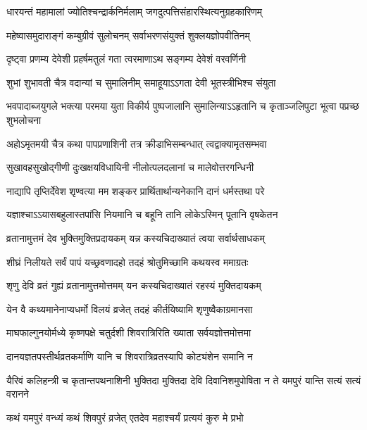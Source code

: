 \twolineshloka
{धारयन्तं महामालां ज्योतिश्चन्द्रार्कनिर्मलाम्}
{जगदुत्पत्तिसंहारस्थित्यनुग्रहकारिणम्} %

\twolineshloka
{महेष्वासमुदाराङ्गं कम्बुग्रीवं सुलोचनम्}
{सर्वाभरणसंयुक्तं शुक्लयज्ञोपवीतिनम्} %

\twolineshloka
{दृष्ट्वा प्रणम्य देवेशी प्रहर्षमतुलं गता}
{त्वरमाणाऽथ सङ्गम्य देवेशं वरवर्णिनी} %

\twolineshloka
{शुभां शुभावती चैत्र वदान्यां च सुमालिनीम्}
{समाहूयाऽऽगता देवी भूतस्त्रीभिश्च संयुता} %

\threelineshloka
{भवपादाब्जयुगले भक्त्या परमया युता}
{विकीर्य पुष्पजालानि सुमालिन्याऽऽहृतानि च}
{कृताञ्जलिपुटा भूत्वा पप्रच्छ शुभलोचना} %


\twolineshloka
{अहोऽमृतमयी चैत्र कथा पापप्रणाशिनी}
{तत्र क्रीडाभिसम्बन्धात् त्वद्वाक्यामृतसम्भवा} %

\twolineshloka
{सुखावहसुखोद्गीणी दुःखक्षयविधायिनी}
{नीलोत्पलदलानां च मालेवोत्तरगन्धिनी} %

\twolineshloka
{नाद्यापि तृप्तिर्देवेश शृण्वत्या मम शङ्कर}
{प्रार्थितार्थान्यनेकानि दानं धर्मस्तथा परे} %

\twolineshloka
{यज्ञाश्चाऽऽयासबहुलास्तपांसि नियमानि च}
{बहूनि तानि लोकेऽस्मिन् पूतानि वृषकेतन} %

\twolineshloka
{व्रतानामुत्तमं देव भुक्तिमुक्तिप्रदायकम्}
{यन्न कस्यचिदाख्यातं त्वया सर्वार्थसाधकम्} %

\twolineshloka
{शीघ्रं निलीयते सर्वं पापं यच्छ्रवणादहो}
{तदहं श्रोतुमिच्छामि कथयस्व ममाग्रतः} %


\twolineshloka
{शृणु देवि व्रतं गुह्यं व्रतानामुत्तमोत्तमम्}
{यन कस्यचिदाख्यातं रहस्यं मुक्तिदायकम्} %

\twolineshloka
{येन वै कथ्यमानेनाप्यधर्मो विलयं व्रजेत्}
{तदहं कीर्तयिष्यामि शृणुष्वैकाग्रमानसा} %

\twolineshloka
{माघफाल्गुनयोर्मध्ये कृष्णपक्षे चतुर्दशी}
{शिवरात्रिरिति ख्याता सर्वयज्ञोत्तमोत्तमा} %

\twolineshloka
{दानयज्ञतपस्तीर्थव्रतकर्माणि यानि च}
{शिवरात्रिव्रतस्यापि कोट्यंशेन समानि न} %

\threelineshloka
{यैरिवं कलिहन्त्री च कृतान्तपथनाशिनी}
{भुक्तिदा मुक्तिदा देवि दिवानिशमुपोषिता}
{न ते यमपुरं यान्ति सत्यं सत्यं वरानने} %


\twolineshloka
{कथं यमपुरं वन्ध्यं कथं शिवपुरं व्रजेत्}
{एतदेव महाश्चर्यं प्रत्ययं कुरु मे प्रभो} %


